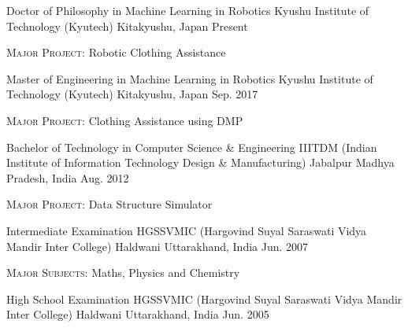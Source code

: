 

\begin{cventries}

  \cventry
    {Doctor of Philosophy in Machine Learning in Robotics} %
    {Kyushu Institute of Technology (Kyutech)} %
    {Kitakyushu, Japan} %
    {Present} %
    {
      \begin{cvitems} %
        \item \textsc{Major Project:} Robotic Clothing Assistance
      \end{cvitems}
    }

  \cventry
    {Master of Engineering in Machine Learning in Robotics} %
    {Kyushu Institute of Technology (Kyutech)} %
    {Kitakyushu, Japan} %
    {Sep. 2017} %
    {
      \begin{cvitems} %
        \item \textsc{Major Project:} Clothing Assistance using DMP
      \end{cvitems}
    }

  \cventry
    {Bachelor of Technology in Computer Science \& Engineering} %
    {IIITDM (Indian Institute of Information Technology Design \& Manufacturing) Jabalpur} %
    {Madhya Pradesh, India} %
    {Aug. 2012} %
    {
      \begin{cvitems} %
        \item \textsc{Major Project:} Data Structure Simulator
      \end{cvitems}
    }

  \cventry
    {Intermediate Examination} %
    {HGSSVMIC (Hargovind Suyal Saraswati Vidya Mandir Inter College) Haldwani} %
    {Uttarakhand, India} %
    {Jun. 2007} %
    {
      \begin{cvitems} %
        \item \textsc{Major Subjects:} Maths, Physics and Chemistry
      \end{cvitems}
    }

  \cventry
    {High School Examination} %
    {HGSSVMIC (Hargovind Suyal Saraswati Vidya Mandir Inter College) Haldwani} %
    {Uttarakhand, India} %
    {Jun. 2005} %
    {} %

\end{cventries}
